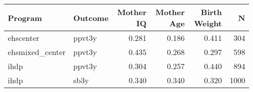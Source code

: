 \begin{table}[ht]
\centering
\begin{tabular}{llrrrr}
  \hline
Program & Outcome & Mother IQ & Mother Age & Birth Weight & N \\ 
  \hline
ehscenter & ppvt3y & 0.281 & 0.186 & 0.411 & 304 \\ 
  ehsmixed\_center & ppvt3y & 0.435 & 0.268 & 0.297 & 598 \\ 
  ihdp & ppvt3y & 0.304 & 0.257 & 0.440 & 894 \\ 
  ihdp & sb3y & 0.340 & 0.340 & 0.320 & 1000 \\ 
   \hline
\end{tabular}
\end{table}
